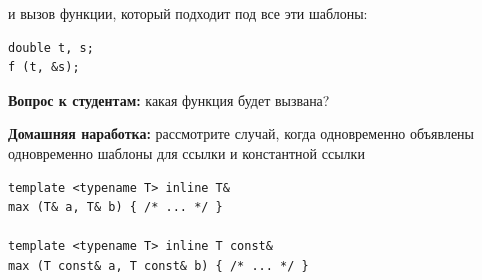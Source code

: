 \documentclass[a4paper,12pt,oneside]{article}
\newif\ifanswers
\begin{document}
и вызов функции, который подходит под все эти шаблоны:

\begin{lstlisting}
double t, s;
f (t, &s);
\end{lstlisting}

\textbf{Вопрос к студентам:} какая функция будет вызвана?

\ifanswers
Все три варианта являются perfect match, но один из них является наиболее частным, один более общим и один максимально общим. В таких случаях компилятор всегда выбирает наименее общий вариант: то есть сначала (3), если мы его вычеркнем, то (2) и в последнюю очередь (1). Но с этим правилом надо быть осторожным, поскольку оно работает только когда и впрямь есть семантически точное совпадение. В другом примере:

\begin{lstlisting}
template <typename T> void f( T, T ); /* (1) */
template <typename T> void f( double*, T* ); /* (2) */
template <typename T> void f( T*, double* ); /* (3) */
template <typename T1 typename T2> void f( T1*, T2 ); /* (4) */
template <typename T1 typename T2> void f( T1, T2* ); /* (5) */
template <typename T1 typename T2> void f( T1*, T2* ); /* (6) */
\end{lstlisting}

При вызове функции:

\begin{lstlisting}
double t, s;
f (&t, &s);
\end{lstlisting}

Точное совпадение даётся всеми перечисленными функциями, при этом важность того, что типы равны (случай 1) не перевешивает важность того, что оба эти типа указатели (случай 6). В итоге компилятор не может придти к решению и выдаст ошибку ``is ambiguous''. Если мы вычеркнем (1, 2, 3), то оставшиеся разрешатся в пользу (6) как наиболее общего совпадения. Но (и это интересно), если оставить (1, 4 и 5), то это всё ещё будет ошибка. Зато (2, 4, 5) однозначно разрешаются в пользу (2). Но оба выигравших номера -- 2 и 6 дают ошибку в паре с 1. Мораль у этого такая: всегда нужно смотреть на наиболее общий семантический тип.
\fi

\textbf{Домашняя наработка:} рассмотрите случай, когда одновременно объявлены одновременно шаблоны для ссылки и константной ссылки

\begin{lstlisting}
template <typename T> inline T& 
max (T& a, T& b) { /* ... */ }

template <typename T> inline T const& 
max (T const& a, T const& b) { /* ... */ }
\end{lstlisting}
\end{document}
